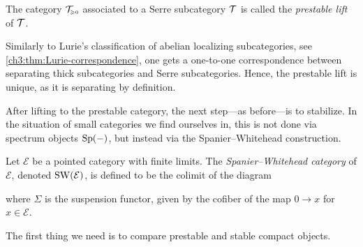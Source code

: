 \begin{definition}
    The category $\mathcal{T}_{\hspace{-1pt}\scriptscriptstyle\geqslant 0}$ associated to a Serre subcategory $\mathcal{T}$ is called the \emph{prestable lift} of $\mathcal{T}$. 
\end{definition}

\begin{remark}
    Similarly to Lurie's classification of abelian localizing subcategories, see \cref{ch3:thm:Lurie-correspondence}, one gets a one-to-one correspondence between separating thick subcategories and Serre subcategories. Hence, the prestable lift is unique, as it is separating by definition. 
\end{remark}

After lifting to the prestable category, the next step---as before---is to stabilize. In the situation of small categories we find ourselves in, this is not done via spectrum objects $\mathrm{Sp}(-)$, but instead via the Spanier--Whitehead construction. 

\begin{definition}
    Let $\mathcal{E}$ be a pointed category with finite limits. The \emph{Spanier--Whitehead category} of $\mathcal{E}$, denoted $\operatorname{SW}(\mathcal{E})$, is defined to be the colimit of the diagram 
    \begin{center}
    \end{center}
    where $\Sigma$ is the suspension functor, given by the cofiber of the map $0\rightarrow x$ for $x\in \mathcal{E}$. 
\end{definition}

The first thing we need is to compare prestable and stable compact objects. 

